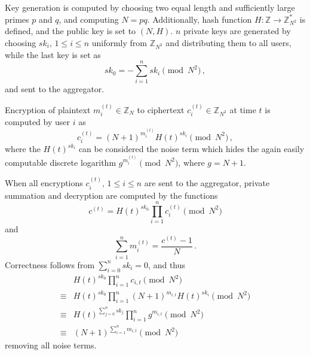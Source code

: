 \documentclass[twocolumn]{autart}
\theoremstyle{definition}
\theoremstyle{remark}
\begin{document}
Key generation is computed by choosing two equal length and sufficiently large primes $p$ and $q$, and computing $N=pq$. Additionally, hash function $H:\mathbb{Z} \rightarrow \mathbb{Z}_{N^2}^*$ is defined, and the public key is set to $(N, H)$. $n$ private keys are generated by choosing $sk_i,\,1\leq i\leq n$ uniformly from $\mathbb{Z}_{N^2}$ and distributing them to all users, while the last key is set as
\begin{equation*}
    sk_0 = -\sum^{n}_{i=1}sk_i \pmod{N^2}\,,
\end{equation*}
and sent to the aggregator.

Encryption of plaintext $m^{(t)}_{i} \in \mathbb{Z}_N$ to ciphertext $c^{(t)}_{i} \in \mathbb{Z}_{N^2}$ at time $t$ is computed by user $i$ as
\begin{equation}
    c^{(t)}_{i} = (N+1)^{m^{(t)}_{i}} H(t)^{sk_i} \pmod{N^2}\,,
\end{equation}
where the $H(t)^{sk_i}$ can be considered the noise term which hides the again easily computable discrete logarithm $g^{m^{(t)}_{i}} \pmod{N^2}$, where $g=N+1$.

When all encryptions $c^{(t)}_{i},\,1\leq i \leq n$ are sent to the aggregator, private summation and decryption are computed by the functions
\begin{equation}
    c^{(t)} = H(t)^{sk_0}\prod^{n}_{i=1}c^{(t)}_{i} \pmod{N^2}
\end{equation}
and
\begin{equation}
    \sum^{n}_{i=1}m^{(t)}_{i} = \frac{c^{(t)}-1}{N}\,. \label{eqn:agg_decryption}
\end{equation}
Correctness follows from $\sum^{n}_{i=0}sk_i = 0$, and thus
\begin{equation*}
    \begin{split}
        &H(t)^{sk_0}\prod^{n}_{i=1}c_{i,t} \pmod{N^2} \\
        \equiv &H(t)^{sk_0}\prod^{n}_{i=1}(N+1)^{m_{i,t}} H(t)^{sk_i} \pmod{N^2} \\
        \equiv &H(t)^{\sum^n_{j=0}sk_j} \prod^{n}_{i=1}g^{m_{i,t}} \pmod{N^2} \\
        \equiv &(N+1)^{\sum^n_{i=1}m_{i,t}} \pmod{N^2}
    \end{split}
\end{equation*}
removing all noise terms.
\end{document}
